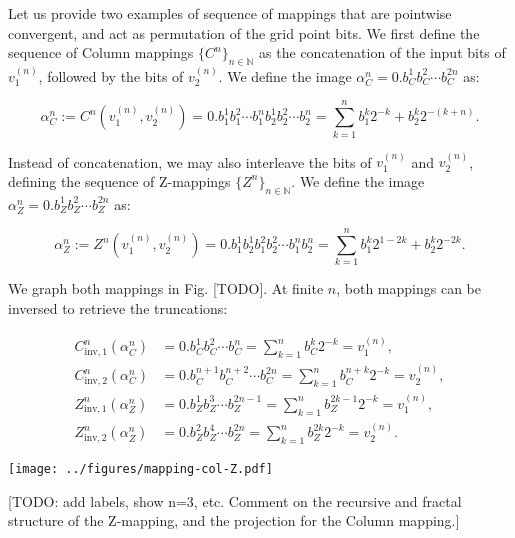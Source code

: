 \documentclass[10pt,letterpaper]{article}
\begin{document}
Let us provide two examples of sequence of mappings that are pointwise convergent, and act as permutation of the grid point bits.
We first define the sequence of Column mappings $\{C^n\}_{n\in\mathbb N}$ as the concatenation of the input bits of $v_1^{(n)}$, followed by the bits of $v_2^{(n)}$. We define the image $\alpha_C^n = 0.b_C^1 b_C^2 \cdots b_C^{2n}$ as:

\begin{equation} \label{eq:def-column-mapping}
\alpha_C^n := C^n(v_1^{(n)}, v_2^{(n)}) = 0.b_1^1 b_1^2 \cdots b_1^n b_2^1 b_2^2 \cdots b_2^n = \sum_{k=1}^n b_1^k 2^{-k} + b_2^k 2^{-(k+n)}.
\end{equation}

Instead of concatenation, we may also interleave the bits of $v_1^{(n)}$ and $v_2^{(n)}$, defining the sequence of Z-mappings $\{Z^n\}_{n\in\mathbb N}$. We define the image $\alpha_Z^n = 0.b_Z^1 b_Z^2 \cdots b_Z^{2n}$ as:

\begin{equation} \label{eq:def-z-mapping}
\alpha_Z^n := Z^n(v_1^{(n)}, v_2^{(n)}) = 0.b_1^1 b_2^1 b_1^2 b_2^2 \cdots b_1^n b_2^n = \sum_{k=1}^n b_1^k 2^{1-2k} + b_2^k 2^{-2k}.
\end{equation}

We graph both mappings in Fig. [TODO]. At finite $n$, both mappings can be inversed to retrieve the truncations:

\begin{equation} \begin{aligned}
C^n_{\textrm{inv},1}(\alpha_C^n) &= 0.b_C^1 b_C^2 \cdots b_C^n = \sum_{k=1}^n b_C^k 2^{-k} = v_1^{(n)}, \\
C^n_{\textrm{inv},2}(\alpha_C^n) &= 0.b_C^{n+1} b_C^{n+2} \cdots b_C^{2n} = \sum_{k=1}^n b_C^{n+k} 2^{-k} = v_2^{(n)}, \\
Z^n_{\textrm{inv},1}(\alpha_Z^n) &= 0.b_Z^1 b_Z^3 \cdots b_Z^{2n-1} = \sum_{k=1}^n b_Z^{2k-1} 2^{-k} = v_1^{(n)},\\
Z^n_{\textrm{inv},2}(\alpha_Z^n) &= 0.b_Z^2 b_Z^4 \cdots b_Z^{2n} = \sum_{k=1}^n b_Z^{2k} 2^{-k} = v_2^{(n)}.
\end{aligned} \end{equation}

\texttt{[image: ../figures/mapping-col-Z.pdf]}

[TODO: add labels, show n=3, etc. Comment on the recursive and fractal structure of the Z-mapping, and the projection for the Column mapping.]
\endif
\end{document}
